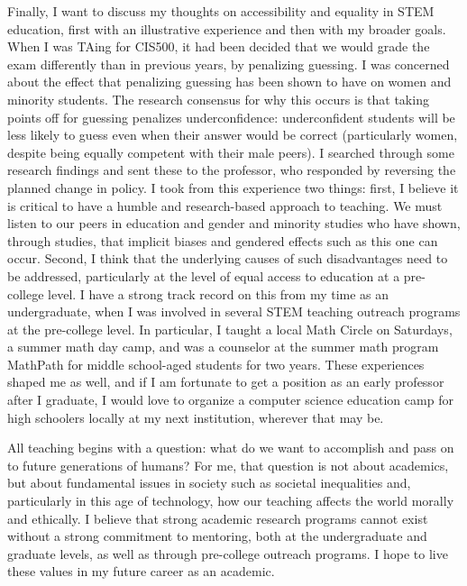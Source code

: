 \documentclass{article}
\begin{document}
Finally, I want to discuss my thoughts on accessibility and equality in STEM education, first with an illustrative experience and then with my broader goals.
When I was TAing for CIS500, it had been decided that we
would grade the exam differently than in previous years, by penalizing guessing.
I was concerned about the effect that penalizing guessing has been shown to have on women and minority students.
The research consensus for why this occurs is that taking points off for guessing penalizes underconfidence: underconfident students will be less likely to guess even when their answer would be correct (particularly women, despite being equally competent with their male peers).
I searched through some research findings and sent these to the professor, who responded by reversing the planned change in policy.
I took from this experience two things: first,
I believe it is critical to have a humble and research-based approach to teaching. We must listen to our peers in education and gender and minority studies who have shown, through studies, that implicit biases and gendered effects such as this one can occur.
Second, I think that the underlying causes of such disadvantages need to be addressed, particularly at the level of equal access to education at a pre-college level.
I have a strong track record on this from my time as an undergraduate,
when I was involved in several STEM teaching outreach programs at the pre-college level. In particular, I taught a local Math Circle on Saturdays, a summer math day camp, and was a counselor at the summer math program MathPath for middle school-aged students for two years.
These experiences shaped me as well, and
if I am fortunate to get a position as an early professor after I graduate,
I would love to organize a computer science education
camp for high schoolers locally at my next institution, wherever that may be.

All teaching begins with a question: what do we want to accomplish and pass on to future generations of humans?
For me, that question is not about academics, but about fundamental issues in society such as societal inequalities and, particularly in this age of technology, how our teaching affects the world morally and ethically.
I believe that strong academic research programs cannot exist without a strong commitment to mentoring, both at the undergraduate and graduate levels, as well as through pre-college outreach programs.
I hope to live these values in my future career as an academic.
\end{document}

